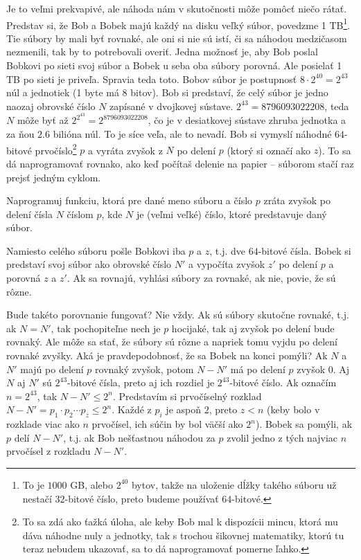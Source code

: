 Je to veľmi prekvapivé, ale náhoda nám v skutočnosti môže pomôcť niečo rátať. 
Predstav si, že Bob a Bobek majú každý na disku veľký súbor, povedzme 1 
TB\footnote{To je $1000$ GB, alebo $2^{40}$ bytov, 
takže na uloženie dĺžky takého súboru už nestačí $32$-bitové číslo,
preto budeme používať $64$-bitové.}.
Tie súbory by mali byť rovnaké, ale oni si nie sú istí, či sa náhodou medzičasom nezmenili,
tak by to potrebovali overiť. Jedna možnosť je, aby Bob poslal Bobkovi po sieti 
svoj súbor a Bobek u seba oba súbory porovná. Ale posielať 1 TB po sieti je priveľa. 
Spravia teda toto. 
Bobov súbor je postupnosť $8\cdot2^{40}=2^{43}$ núl a jednotiek (1 byte má 8 bitov).
Bob si predstaví, že celý súbor je jedno naozaj obrovské číslo $N$
zapísané v dvojkovej sústave.
$2^{43}=8796093022208$, teda $N$ môže byť až
$2^{2^{43}}=2^{8796093022208}$, čo je v desiatkovej sústave
zhruba jednotka a za ňou $2.6$ bilióna núl. 
To je síce veľa, ale to nevadí.
Bob si vymyslí náhodné $64$-bitové prvočíslo\footnote{To sa
zdá ako ťažká úloha, ale keby Bob mal k dispozícii mincu, ktorá mu dáva náhodne nuly
a jednotky, tak s trochou šikovnej matematiky, ktorú tu teraz nebudem ukazovať,
sa to dá naprogramovať pomerne ľahko.} $p$ a vyráta zvyšok z $N$ po delení $p$ (ktorý si
označí ako $z$).
To sa dá naprogramovať rovnako, ako keď počítaš delenie na papier -- súborom stačí 
raz prejsť jedným cyklom.

\begin{uloha}
  Naprogramuj funkciu, ktorá pre dané meno súboru a číslo $p$ zráta zvyšok po delení
  čísla $N$ číslom $p$, kde $N$ je (veľmi veľké) číslo, ktoré predstavuje daný súbor.
\end{uloha}

Namiesto celého súboru pošle Bobkovi iba $p$ a $z$, t.j. dve $64$-bitové čísla. 
Bobek si predstaví svoj súbor ako obrovské číslo $N'$ a
vypočíta  zvyšok $z'$ po delení $p$ a porovná $z$ a $z'$.
Ak sa rovnajú, vyhlási súbory za rovnaké, ak nie, povie, že sú rôzne. 


Bude takéto porovnanie fungovať? Nie vždy. Ak sú súbory skutočne rovnaké, t.j.
ak $N=N'$, tak pochopiteľne nech je $p$ hocijaké, tak aj zvyšok po delení bude rovnaký.
Ale môže sa stať, že súbory sú rôzne a napriek tomu vyjdu po delení rovnaké zvyšky.
Aká je pravdepodobnosť, že sa Bobek na konci pomýli?
Ak $N$ a $N'$ majú po delení $p$ rovnaký zvyšok, potom $N-N'$ má po delení $p$ zvyšok $0$.
Aj $N$ aj $N'$ sú $2^{43}$-bitové čísla, preto aj ich rozdiel je $2^{43}$-bitové číslo.
Ak označím $n=2^{43}$, tak $N-N'\le 2^n$. Predstavím si prvočíselný rozklad 
$N-N'=p_1\cdot p_2\cdots p_z\le 2^n$. Každé z $p_i$
je aspoň $2$, preto $z<n$ (keby bolo v rozklade viac ako $n$ prvočísel, ich súčin
by bol väčší ako $2^n$). Bobek sa pomýli, ak $p$ delí $N-N'$, t.j. ak
Bob nešťastnou náhodou za $p$
zvolil jedno z tých najviac $n$ prvočísel z rozkladu $N-N'$. 


